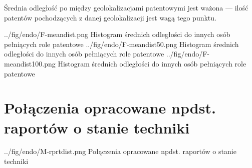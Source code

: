 \newpage
{}
{
  \begin{uwaga}
  Średnia odległość po między geolokalizacjami patentowymi jest ważona ---
  ilość patentów pochodzących z danej geolokalizacji jest wagą tego punktu.
  \end{uwaga}
}

\figsidesTri
  {../fig/endo/F-meandist.png}
    {Histogram średnich odległości do innych osób pełniących role patentowe}
  {../fig/endo/F-meandist50.png}
    {Histogram średnich odległości do innych osób pełniących role patentowe}
  {../fig/endo/F-meandist100.png}
    {Histogram średnich odległości do innych osób pełniących role patentowe}



\newpage

\section{Połączenia opracowane npdst. raportów o stanie techniki}

  {../fig/endo/M-rprtdist.png}
    {Połączenia opracowane npdst. raportów o stanie techniki}

